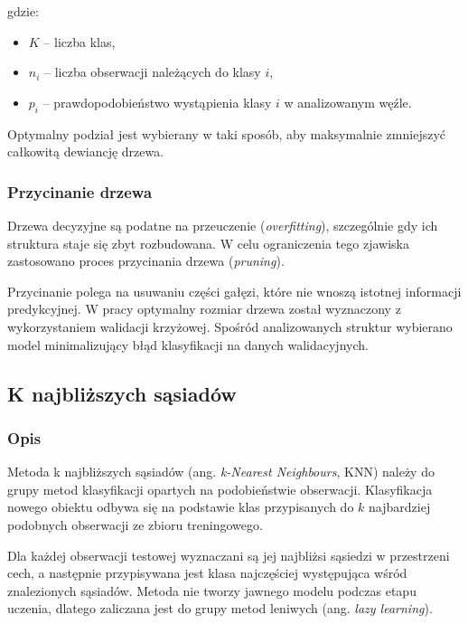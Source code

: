 \documentclass[twoside]{customStyle}
\begin{document}
gdzie:
\begin{itemize}
    \item $K$ -- liczba klas,
    \item $n_i$ -- liczba obserwacji należących do klasy $i$,
    \item $p_i$ -- prawdopodobieństwo wystąpienia klasy $i$ w analizowanym węźle.
\end{itemize}

Optymalny podział jest wybierany w taki sposób, aby maksymalnie zmniejszyć całkowitą dewiancję drzewa.

\subsubsection{Przycinanie drzewa}

Drzewa decyzyjne są podatne na przeuczenie (\textit{overfitting}), szczególnie gdy ich struktura staje się zbyt rozbudowana. W celu ograniczenia tego zjawiska zastosowano proces przycinania drzewa (\textit{pruning}).

Przycinanie polega na usuwaniu części gałęzi, które nie wnoszą istotnej informacji predykcyjnej. W pracy optymalny rozmiar drzewa został wyznaczony z wykorzystaniem walidacji krzyżowej. Spośród analizowanych struktur wybierano model minimalizujący błąd klasyfikacji na danych walidacyjnych.

\subsection{K najbliższych sąsiadów}

\subsubsection{Opis}

Metoda k najbliższych sąsiadów (ang. \textit{k-Nearest Neighbours}, KNN)  \cite{KNN} należy do grupy metod klasyfikacji opartych na podobieństwie obserwacji. Klasyfikacja nowego obiektu odbywa się na podstawie klas przypisanych do $k$ najbardziej podobnych obserwacji ze zbioru treningowego.

Dla każdej obserwacji testowej wyznaczani są jej najbliżsi sąsiedzi w przestrzeni cech, a następnie przypisywana jest klasa najczęściej występująca wśród znalezionych sąsiadów. Metoda nie tworzy jawnego modelu podczas etapu uczenia, dlatego zaliczana jest do grupy metod leniwych (ang. \textit{lazy learning}).
\end{document}
